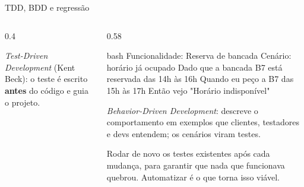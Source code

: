 \begin{frame}[fragile]{TDD, BDD e regressão}
  \begin{columns}[T]
    \begin{column}{0.4\textwidth}
      \centering
      \begin{definicao}[TDD]
        \emph{Test-Driven Development} (Kent Beck): o teste é escrito \textbf{antes} do código e guia o projeto.
      \end{definicao}
    \end{column}
    \begin{column}{0.58\textwidth}
\begin{codigo}[title=BDD: cenário em linguagem natural (Gherkin)]{bash}
Funcionalidade: Reserva de bancada
  Cenário: horário já ocupado
    Dado que a bancada B7 está reservada das 14h às 16h
    Quando eu peço a B7 das 15h às 17h
    Então vejo "Horário indisponível"
\end{codigo}
      \begin{definicao}[BDD]
        \emph{Behavior-Driven Development}: descreve o comportamento em exemplos que clientes, testadores e devs entendem; os cenários viram testes.
      \end{definicao}
      \begin{definicao}
        Rodar de novo os testes existentes após cada mudança, para garantir que nada que funcionava quebrou. Automatizar é o que torna isso viável.
      \end{definicao}
    \end{column}
  \end{columns}
\end{frame}

